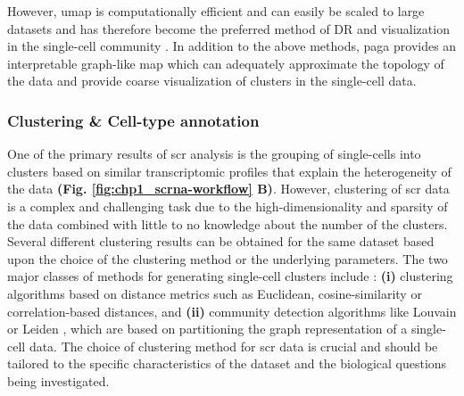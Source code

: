 However, \gls{umap} is computationally efficient and can easily be scaled to large datasets and has therefore become the preferred method of DR and visualization in the single-cell community \textbf{\cite{kobak_initialization_2021,becht_dimensionality_2018}}. In addition to the above methods, \gls{paga} \textbf{\cite{wolf_paga_2019}} provides an interpretable graph-like map which can adequately approximate the topology of the data and provide coarse visualization of clusters in the single-cell data.

\subsubsection{Clustering \& Cell-type annotation}
One of the primary results of \gls{scr} analysis is the grouping of single-cells into clusters based on similar transcriptomic profiles that explain the heterogeneity of the data \textbf{(Fig. \ref{fig:chp1_scrna-workflow} B)}. However, clustering of \gls{scr} data is a complex and challenging task due to the high-dimensionality and sparsity of the data combined with little to no knowledge about the number of the clusters. Several different clustering results can be obtained for the same dataset based upon the choice of the clustering method or the underlying parameters. %
The two major classes of methods for generating single-cell clusters include : \textbf{(i)} clustering algorithms based on distance metrics such as Euclidean, cosine-similarity or correlation-based distances, and \textbf{(ii)} community detection algorithms like Louvain \textbf{\cite{blondel_fast_2008}} or Leiden \textbf{\cite{traag_louvain_2019}}, which are based on partitioning the  graph representation of a single-cell data. The choice of clustering method for \gls{scr} data is crucial and should be tailored to the specific characteristics of the dataset and the biological questions being investigated.\\
